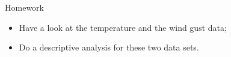 \message{ !name(showv2.tex)}\documentclass[mode=present,style=simple]{powerdot}
\theoremstyle{plain}%
\theoremstyle{definition}
\theoremstyle{remark}
\begin{document}
\begin{slide}{Homework}
  \begin{itemize}
  \item Have a look at the temperature and the wind gust data;
  \item Do a descriptive analysis for these two data sets.
  \end{itemize}
\end{slide}


\end{document}
